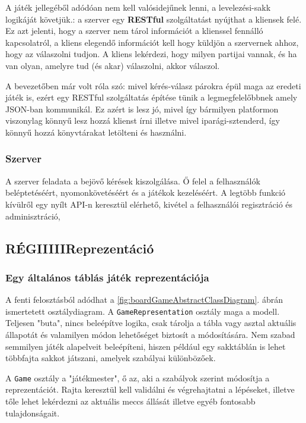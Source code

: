 \documentclass[twoside, a4paper, 12pt]{article}
\begin{document}
A játék jellegéből adódóan nem kell valósidejűnek lenni, a levelezési-sakk logikáját követjük.: a szerver egy \textbf{RESTful} szolgáltatást nyújthat a kliensek felé. Ez azt jelenti, hogy a szerver nem tárol információt a klienssel fennálló kapcsolatról, a kliens elegendő információt kell hogy küldjön a szervernek ahhoz, hogy az válaszolni tudjon. A kliens lekérdezi, hogy milyen partijai vannak, és ha van olyan, amelyre tud (és akar) válaszolni, akkor válaszol.



A bevezetőben már volt róla szó: mivel kérés-válasz párokra épül maga az eredeti játék is, ezért egy RESTful szolgáltatás építése tünik a legmegfelelőbbnek amely JSON-ban kommunikál. Ez azért is lesz jó, mivel így bármilyen platformon viszonylag könnyű lesz hozzá klienst írni illetve mivel iparági-sztenderd, így könnyű hozzá könyvtárakat letölteni és használni.

\subsubsection{Szerver}
A szerver feladata a bejövő kérések kiszolgálása. Ő felel a felhasználók beléptetéséért, nyomonkövetéséért és a játékok kezeléséért. A legtöbb funkció kívülről egy nyílt API-n keresztül elérhető, kivétel a felhasználói regisztráció és adminisztráció,





\subsection{RÉGIIIIIReprezentáció}

\subsubsection{Egy általános táblás játék reprezentációja}



A fenti felosztásból adódhat a \ref{fig:boardGameAbstractClassDiagram}. ábrán ismertetett osztálydiagram. A \texttt{GameRepresentation} osztály maga a modell. Teljesen "buta", nincs beleépítve logika, csak tárolja a tábla vagy asztal aktuális állapotát és valamilyen módon lehetőséget biztosít a módosítására. Nem szabad semmilyen játék alapelveit beleépíteni, hiszen például egy sakktáblán is lehet többfajta sakkot játszani, amelyek szabályai különbözőek.

A \texttt{Game} osztály a "játékmester", ő az, aki a szabályok szerint módosítja a reprezentációt. Rajta keresztül kell validálni és végrehajtatni a lépéseket, illetve tőle lehet lekérdezni az aktuális meccs állását illetve egyéb fontosabb tulajdonságait.
\end{document}

